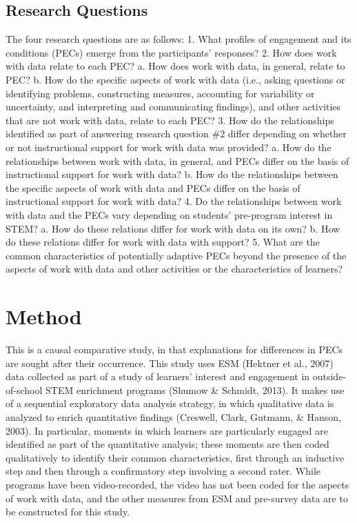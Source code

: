 \documentclass[]{msu-thesis}
\theoremstyle{definition}
\theoremstyle{definition}
\theoremstyle{definition}
\theoremstyle{remark}
\begin{document}
\subsection{Research Questions}\label{research-questions}

The four research questions are as follows: 1. What profiles of
engagement and its conditions (PECs) emerge from the participants'
responses? 2. How does work with data relate to each PEC? a. How does
work with data, in general, relate to PEC? b. How do the specific
aspects of work with data (i.e., asking questions or identifying
problems, constructing measures, accounting for variability or
uncertainty, and interpreting and communicating findings), and other
activities that are not work with data, relate to each PEC? 3. How do
the relationships identified as part of answering research question \#2
differ depending on whether or not instructional support for work with
data was provided? a. How do the relationships between work with data,
in general, and PECs differ on the basis of instructional support for
work with data? b. How do the relationships between the specific aspects
of work with data and PECs differ on the basis of instructional support
for work with data? 4. Do the relationships between work with data and
the PECs vary depending on students' pre-program interest in STEM? a.
How do these relations differ for work with data on its own? b. How do
these relations differ for work with data with support? 5. What are the
common characteristics of potentially adaptive PECs beyond the presence
of the aspects of work with data and other activities or the
characteristics of learners?

\section{Method}\label{method}

This is a causal comparative study, in that explanations for differences
in PECs are sought after their occurrence. This study uses ESM (Hektner
et al., 2007) data collected as part of a study of learners' interest
and engagement in outside-of-school STEM enrichment programs (Shumow \&
Schmidt, 2013). It makes use of a sequential exploratory data analysis
strategy, in which qualitative data is analyzed to enrich quantitative
findings (Creswell, Clark, Gutmann, \& Hanson, 2003). In particular,
moments in which learners are particularly engaged are identified as
part of the quantitative analysis; these moments are then coded
qualitatively to identify their common characteristics, first through an
inductive step and then through a confirmatory step involving a second
rater. While programs have been video-recorded, the video has not been
coded for the aspects of work with data, and the other measures from ESM
and pre-survey data are to be constructed for this study.
\end{document}
